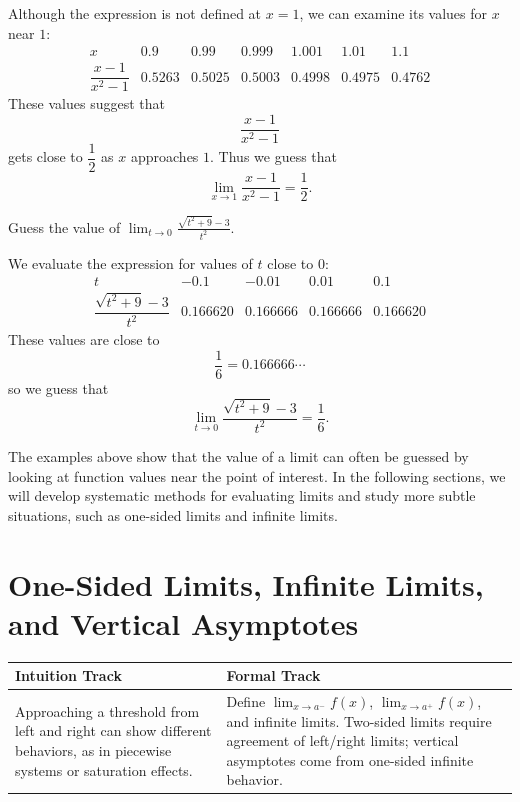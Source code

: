 \begin{solution}
Although the expression is not defined at \(x=1\), we can examine its values for \(x\) near \(1\):
\[
\begin{array}{c|cccccc}
x & 0.9 & 0.99 & 0.999 & 1.001 & 1.01 & 1.1 \\ \hline
\dfrac{x-1}{x^{2}-1} & 0.5263 & 0.5025 & 0.5003 & 0.4998 & 0.4975 & 0.4762
\end{array}
\]
These values suggest that
\[
\frac{x-1}{x^{2}-1}
\]
gets close to \(\dfrac{1}{2}\) as \(x\) approaches \(1\). Thus we guess that
\[
\lim_{x\to 1}\frac{x-1}{x^{2}-1}=\frac{1}{2}.
\]
\end{solution}

\begin{example}
Guess the value of
\(\displaystyle
\lim_{t\to 0}\frac{\sqrt{t^{2}+9}-3}{t^{2}}.
\)
\end{example}

\begin{solution}
We evaluate the expression for values of \(t\) close to \(0\):
\[
\begin{array}{c|cccc}
t & -0.1 & -0.01 & 0.01 & 0.1 \\ \hline
\dfrac{\sqrt{t^{2}+9}-3}{t^{2}} & 0.166620 & 0.166666 & 0.166666 & 0.166620
\end{array}
\]
These values are close to
\[
\frac{1}{6}=0.166666\cdots
\]
so we guess that
\[
\lim_{t\to 0}\frac{\sqrt{t^{2}+9}-3}{t^{2}}=\frac{1}{6}.
\]
\end{solution}

The examples above show that the value of a limit can often be guessed by looking at function values near the point of interest. In the following sections, we will develop systematic methods for evaluating limits and study more subtle situations, such as one-sided limits and infinite limits.

\section{One-Sided Limits, Infinite Limits, and Vertical Asymptotes}

\begin{center}
\renewcommand{\arraystretch}{1.2}
\begin{tabular}{|p{}|p{}|}
\hline
\textbf{Intuition Track} & \textbf{Formal Track} \\
\hline
Approaching a threshold from left and right can show different behaviors, as in piecewise systems or saturation effects. & Define \(\lim_{x\to a^-}f(x)\), \(\lim_{x\to a^+}f(x)\), and infinite limits. Two-sided limits require agreement of left/right limits; vertical asymptotes come from one-sided infinite behavior. \\
\hline
\end{tabular}
\end{center}

